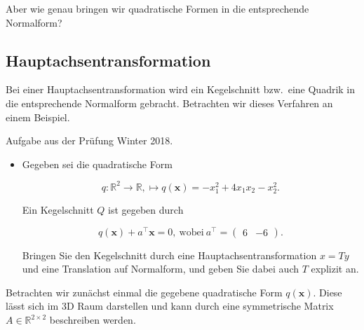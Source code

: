 Aber wie genau bringen wir quadratische Formen in die entsprechende Normalform?

\subsection{Hauptachsentransformation}

Bei einer Hauptachsentransformation wird ein Kegelschnitt bzw.\ eine Quadrik in die entsprechende Normalform gebracht. Betrachten wir dieses Verfahren an einem Beispiel. 

\vspace{1\baselineskip}

Aufgabe aus der Prüfung Winter 2018. 
\begin{itemize}
    \item Gegeben sei die quadratische Form 

    \begin{equation*}
        q: \mathbb{R}^2 \to \mathbb{R}, \mapsto q(\mathbf{x})=-x_1^2+4x_1x_2-x_2^2.
    \end{equation*}

    Ein Kegelschnitt \( Q \) ist gegeben durch 

    \begin{equation*}
        q(\mathbf{x}) + a^\top \mathbf{x} = 0, \ \text{wobei} \ a^\top = \begin{pmatrix} 6 & -6 \end{pmatrix}.
    \end{equation*}

    Bringen Sie den Kegelschnitt durch eine Hauptachsentransformation \( x = Ty \) und eine Translation auf Normalform, und geben Sie dabei auch \( T \) explizit an. 

\end{itemize}

Betrachten wir zunächst einmal die gegebene quadratische Form \( q(\mathbf{x}) \). Diese lässt sich im 3D Raum darstellen und kann durch eine symmetrische Matrix \( A \in \mathbb{R}^{2 \times 2} \) beschreiben werden. 

